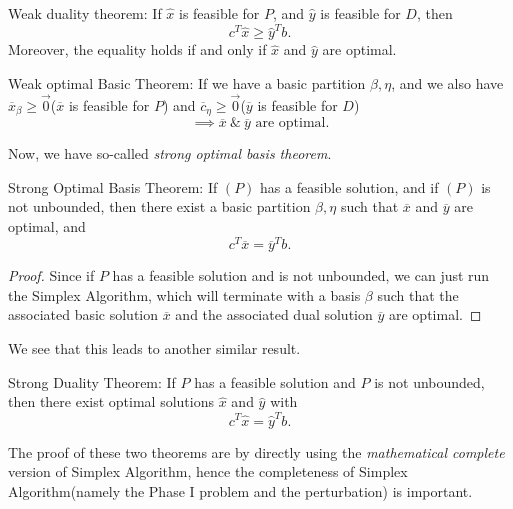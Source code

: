\begin{prev}
	Weak duality theorem: If \(\hat{x}\) is feasible for \(P\), and \(\hat{y}\)
	is feasible for \(D\), then
	\[
		c^{T} \hat{x} \geq  \hat{y}^{T} b.
	\]
	Moreover, the equality holds if and only if \(\hat{x}\) and \(\hat{y}\) are optimal.
\end{prev}

\begin{theorem}
	Weak optimal Basic Theorem: If we have a basic partition \(\beta, \eta\), and we also have
	\(\overline{x}_{\beta}\geq  \vec{0}\)(\(\overline{x}\) is feasible for \(P\)) and \(\overline{c}_{\eta} \geq  \vec{0}\)(\(\overline{y}\) is feasible for \(D\))
	\[
		\implies \overline{x}\ \&\ \overline{y} \text{ are optimal}.
	\]
\end{theorem}

Now, we have so-called \emph{strong optimal basis theorem}.
\begin{theorem}
	Strong Optimal Basis Theorem: If \((P)\) has a feasible solution, and if \((P)\) is not unbounded, then there exist a basic partition \(\beta, \eta\) such that
	\(\overline{x}\) and \(\overline{y}\) are optimal, and
	\[
		c^{T} \overline{x} = \overline{y}^{T} b.
	\]
\end{theorem}
\begin{proof}
	Since if \(P\) has a feasible solution and is not unbounded, we can just run the Simplex Algorithm, which will terminate with a basis \(\beta\) such
	that the associated basic solution \(\overline{x}\) and the associated dual solution \(\overline{y}\) are optimal.
\end{proof}

We see that this leads to another similar result.
\begin{theorem}
	\label{strong duality theorem}
	Strong Duality Theorem: If \(P\) has a feasible solution and \(P\) is not unbounded, then there exist optimal solutions
	\(\hat{x}\) and \(\hat{y}\) with
	\[
		c^{T} \hat{x} = \hat{y}^{T} b.
	\]
\end{theorem}

\begin{note}
	The proof of these two theorems are by directly using the \emph{mathematical complete} version of Simplex Algorithm, hence the completeness of
	Simplex Algorithm(namely the Phase I problem and the perturbation) is important.
\end{note}

